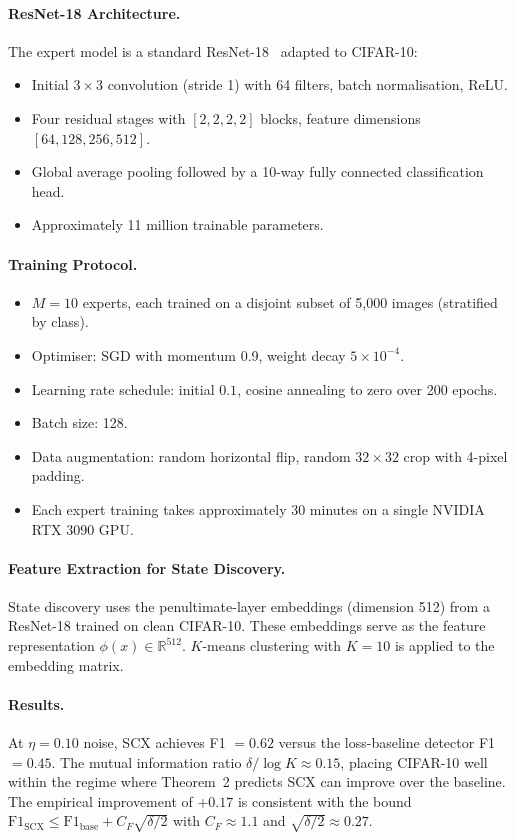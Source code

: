 \paragraph{ResNet-18 Architecture.}
The expert model is a standard ResNet-18~\cite{he2016resnet} adapted to CIFAR-10:
\begin{itemize}
    \item Initial $3 \times 3$ convolution (stride 1) with 64 filters, batch normalisation, ReLU.
    \item Four residual stages with $[2, 2, 2, 2]$ blocks, feature dimensions $[64, 128, 256, 512]$.
    \item Global average pooling followed by a 10-way fully connected classification head.
    \item Approximately 11 million trainable parameters.
\end{itemize}

\paragraph{Training Protocol.}
\begin{itemize}
    \item $M = 10$ experts, each trained on a disjoint subset of 5,000 images (stratified by class).
    \item Optimiser: SGD with momentum 0.9, weight decay $5 \times 10^{-4}$.
    \item Learning rate schedule: initial $0.1$, cosine annealing to zero over 200 epochs.
    \item Batch size: 128.
    \item Data augmentation: random horizontal flip, random $32 \times 32$ crop with 4-pixel padding.
    \item Each expert training takes approximately 30 minutes on a single NVIDIA RTX 3090 GPU.
\end{itemize}

\paragraph{Feature Extraction for State Discovery.}
State discovery uses the penultimate-layer embeddings (dimension 512) from a ResNet-18 trained on clean CIFAR-10. These embeddings serve as the feature representation $\phi(x) \in \mathbb{R}^{512}$. $K$-means clustering with $K = 10$ is applied to the embedding matrix.

\paragraph{Results.}
At $\eta = 0.10$ noise, SCX achieves F1 $= 0.62$ versus the loss-baseline detector F1 $= 0.45$. The mutual information ratio $\delta / \log K \approx 0.15$, placing CIFAR-10 well within the regime where Theorem~2 predicts SCX can improve over the baseline. The empirical improvement of $+0.17$ is consistent with the bound $\mathrm{F1}_{\mathrm{SCX}} \leq \mathrm{F1}_{\mathrm{base}} + C_F \sqrt{\delta/2}$ with $C_F \approx 1.1$ and $\sqrt{\delta/2} \approx 0.27$.

